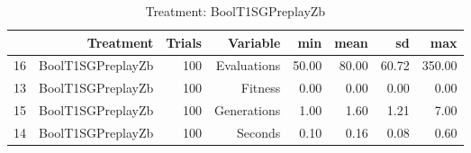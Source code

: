 \begin{table}[ht]
\centering
\begin{tabular}{rrrrrrrr}
  \hline
 & Treatment & Trials & Variable & min & mean & sd & max \\ 
  \hline
16 & BoolT1SGPreplayZb & 100 & Evaluations & 50.00 & 80.00 & 60.72 & 350.00 \\ 
  13 & BoolT1SGPreplayZb & 100 & Fitness & 0.00 & 0.00 & 0.00 & 0.00 \\ 
  15 & BoolT1SGPreplayZb & 100 & Generations & 1.00 & 1.60 & 1.21 & 7.00 \\ 
  14 & BoolT1SGPreplayZb & 100 & Seconds & 0.10 & 0.16 & 0.08 & 0.60 \\ 
   \hline
\end{tabular}
\caption{Treatment: BoolT1SGPreplayZb} 
\end{table}
